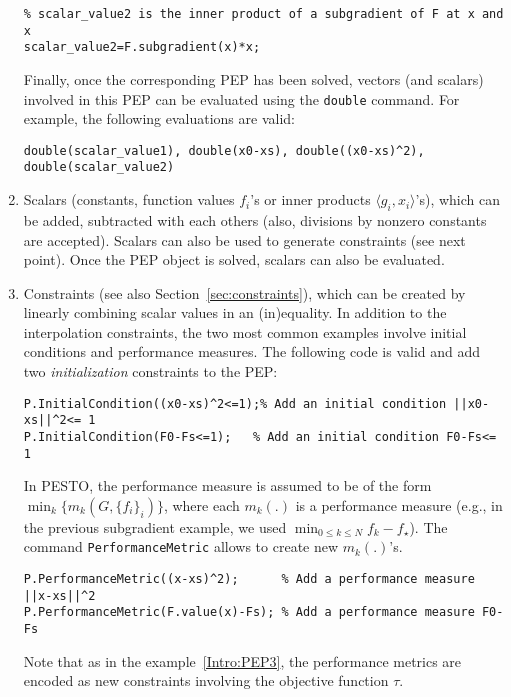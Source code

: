 \documentclass[11pt,a4paper]{article}
\newcommand{\inner}[2]{{\langle #1, #2\rangle}}
\begin{document}
\begin{enumerate}
\begin{lstlisting}
% scalar_value2 is the inner product of a subgradient of F at x and x
scalar_value2=F.subgradient(x)*x; 
\end{lstlisting}
Finally, once the corresponding PEP has been solved, vectors (and scalars) involved in this PEP can be evaluated using the \verb?double? command. For example, the following evaluations are valid:\\[-1cm]
\begin{lstlisting}
double(scalar_value1), double(x0-xs), double((x0-xs)^2), double(scalar_value2)
\end{lstlisting}
\item Scalars (constants, function values $f_i$'s or inner products $\inner{g_i}{x_i}$'s), which can be added, subtracted with each others (also, divisions by nonzero constants are accepted). Scalars can also be used to generate constraints (see next point). Once the PEP object is solved, scalars can also be evaluated.
\item Constraints (see also Section~\ref{sec:constraints}), which can be created by linearly combining scalar values in an (in)equality. In addition to the interpolation constraints, the two most common examples involve initial conditions and performance measures. The following code is valid and add two \emph{initialization} constraints to the PEP:\\[-1cm]
\begin{lstlisting}
P.InitialCondition((x0-xs)^2<=1);% Add an initial condition ||x0-xs||^2<= 1
P.InitialCondition(F0-Fs<=1);	% Add an initial condition F0-Fs<= 1
\end{lstlisting}
In PESTO, the performance measure is assumed to be of the form $\min_k \{m_k(G,\{f_i\}_i)\}$, where each $m_k(.)$ is a performance measure (e.g., in the previous subgradient example, we used $\min_{0\leq k \leq N} f_k-f_\star$). The command \verb?PerformanceMetric? allows to create new $m_k(.)$'s.\\[-1cm]
\begin{lstlisting}
P.PerformanceMetric((x-xs)^2); 		% Add a performance measure ||x-xs||^2
P.PerformanceMetric(F.value(x)-Fs);	% Add a performance measure F0-Fs
\end{lstlisting}
Note that as in the example~\eqref{Intro:PEP3}, the performance metrics are encoded as new constraints involving the objective function $\tau$. 
\end{enumerate}
\newpage
\end{document}
